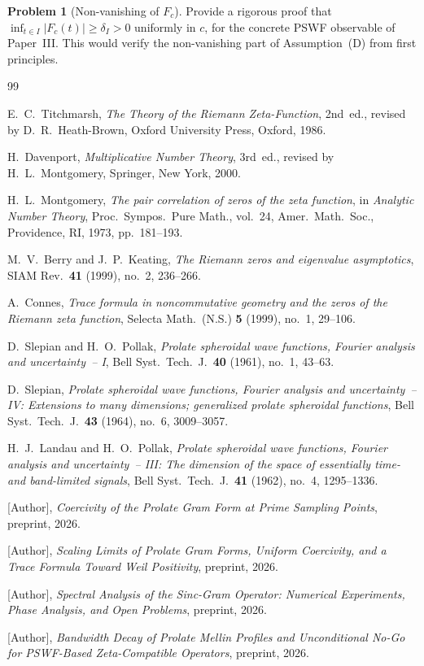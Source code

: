 \documentclass[12pt,a4paper]{amsart}
\theoremstyle{definition}
\newtheorem{problem}[theorem]{Problem}
\begin{document}
\begin{problem}[Non-vanishing of $F_c$]
\label{prob:nonvanishing}
Provide a rigorous proof that
$\inf_{t \in I}|F_c(t)| \ge \delta_I > 0$
uniformly in $c$, for the concrete PSWF observable
of Paper~III. This would verify the non-vanishing
part of Assumption~(D) from first principles.
\end{problem}

\begin{thebibliography}{99}

E.~C.~Titchmarsh,
\textit{The Theory of the Riemann Zeta-Function},
2nd~ed., revised by D.~R.~Heath-Brown,
Oxford University Press, Oxford, 1986.

H.~Davenport,
\textit{Multiplicative Number Theory},
3rd~ed., revised by H.~L.~Montgomery,
Springer, New York, 2000.

H.~L.~Montgomery,
\textit{The pair correlation of zeros of the zeta
function},
in \textit{Analytic Number Theory},
Proc.\ Sympos.\ Pure Math., vol.~24,
Amer.\ Math.\ Soc., Providence, RI, 1973,
pp.~181--193.

M.~V.~Berry and J.~P.~Keating,
\textit{The Riemann zeros and eigenvalue asymptotics},
SIAM Rev.\ \textbf{41} (1999), no.~2, 236--266.

A.~Connes,
\textit{Trace formula in noncommutative geometry and
the zeros of the Riemann zeta function},
Selecta Math.\ (N.S.) \textbf{5} (1999), no.~1,
29--106.

D.~Slepian and H.~O.~Pollak,
\textit{Prolate spheroidal wave functions, Fourier
analysis and uncertainty~-- I},
Bell Syst.\ Tech.\ J.\ \textbf{40} (1961), no.~1,
43--63.

D.~Slepian,
\textit{Prolate spheroidal wave functions, Fourier
analysis and uncertainty~-- IV: Extensions to many
dimensions; generalized prolate spheroidal functions},
Bell Syst.\ Tech.\ J.\ \textbf{43} (1964), no.~6,
3009--3057.

H.~J.~Landau and H.~O.~Pollak,
\textit{Prolate spheroidal wave functions, Fourier
analysis and uncertainty~-- III: The dimension of the
space of essentially time- and band-limited signals},
Bell Syst.\ Tech.\ J.\ \textbf{41} (1962), no.~4,
1295--1336.

[Author],
\textit{Coercivity of the Prolate Gram Form at Prime
Sampling Points}, preprint, 2026.

[Author],
\textit{Scaling Limits of Prolate Gram Forms, Uniform
Coercivity, and a Trace Formula Toward Weil
Positivity}, preprint, 2026.

[Author],
\textit{Spectral Analysis of the Sinc-Gram Operator:
Numerical Experiments, Phase Analysis, and Open
Problems}, preprint, 2026.

[Author],
\textit{Bandwidth Decay of Prolate Mellin Profiles and
Unconditional No-Go for PSWF-Based Zeta-Compatible
Operators}, preprint, 2026.

\end{thebibliography}
\end{document}
